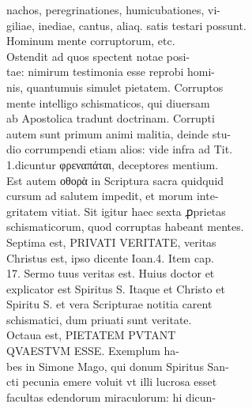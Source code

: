 \documentclass{article}
\begin{document}
\begin{pages}
{                }nachos, peregrinationes, humicubationes, vi- \\
                giliae, inediae, cantus, aliaq. satis testari possunt. \\
                Hominum mente corruptorum, etc. \\
                Ostendit ad quos spectent notae posi- \\
                tae: nimirum testimonia esse reprobi homi- \\
                nis, quantumuis simulet pietatem. Corruptos \\
                mente intelligo schismaticos, qui diuersam \\
                ab Apostolica tradunt doctrinam. Corrupti \\
                autem sunt primum animi malitia, deinde stu- \\
                dio corrumpendi etiam alios: vide infra ad Tit. \\
                1.dicuntur φρεναπάται, deceptores mentium. \\
                Est autem οθορὰ in Scriptura sacra quidquid \\
                cursum ad salutem impedit, et morum inte- \\
                gritatem vitiat. Sit igitur haec sexta ꝓprietas \\
                schismaticorum, quod corruptas habeant mentes. \\
                Septima est, PRIVATI VERITATE, veritas \\
                Christus est, ipso dicente Ioan.4. Item cap. \\
                17. Sermo tuus veritas est. Huius doctor et \\
                explicator est Spiritus S. Itaque et Christo et \\
                Spiritu S. et vera Scripturae notitia carent \\
                schismatici, dum priuati sunt veritate. \\
                Octaua est, PIETATEM PVTANT \\
                QVAESTVM ESSE. Exemplum ha- \\
                bes in Simone Mago, qui donum Spiritus San- \\
                cti pecunia emere voluit vt illi lucrosa esset \\
                facultas edendorum miraculorum: hi dicun- \\

\end{pages}
\end{document}
